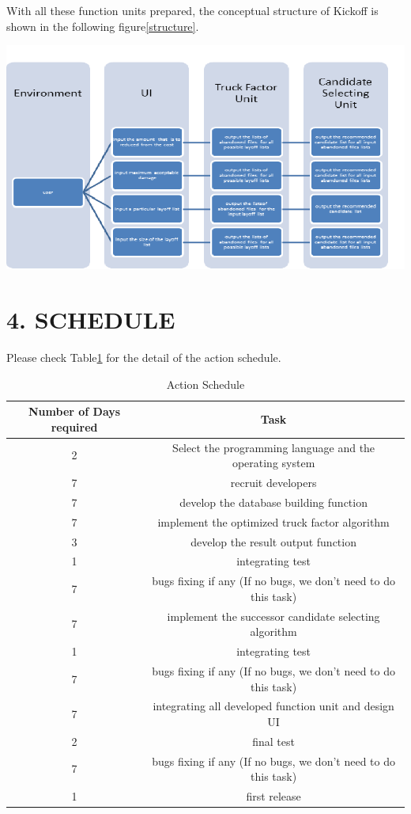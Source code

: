 \documentclass[12pt, a4paper, openright]{report}
\begin{document}
With all these function units prepared, the conceptual structure of Kickoff is shown in the following figure\ref{structure}.
\begin{center}
	\includegraphics[scale=0.8]{structure}
	\label{structure}
\end{center}


\newpage
\section* {4. SCHEDULE}
Please check Table\ref{schedule} for the detail of the action schedule.
\begin{table}[h]		
	\centering            
	\caption{Action Schedule}            
	\begin{tabular}{|c|c|}            
		\hline Number of Days required & Task   \\ \hline
		  2 & Select the programming language and the operating system \\ \hline
		  7 & recruit developers  \\ \hline
		  7 & develop the database building function  \\ \hline
          7 & implement the optimized truck factor algorithm  \\ \hline
          3 & develop the result output function \\ \hline
          1 & integrating test  \\ \hline
          7 & bugs fixing if any  (If no bugs, we don't need to do this task)\\ \hline
          7 & implement the successor candidate selecting algorithm \\ \hline
          1 & integrating test  \\ \hline
          7 & bugs fixing if any  (If no bugs, we don't need to do this task)\\ \hline
          7 & integrating all developed function unit and design UI  \\ \hline
          2 & final test \\ \hline
          7 & bugs fixing if any  (If no bugs, we don't need to do this task)\\ \hline
          1 & first release  \\ \hline
	\end{tabular}            
	\label{schedule}            
\end{table}
\newpage
\end{document}

